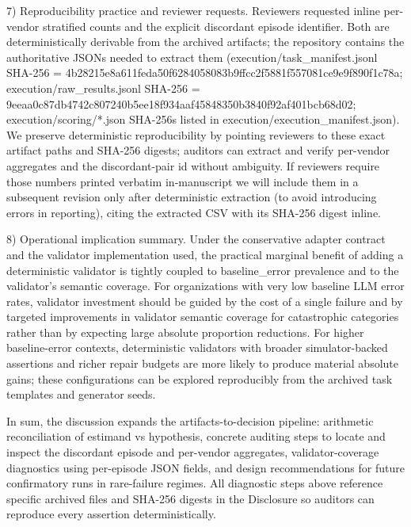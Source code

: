 \documentclass[conference]{IEEEtran}
\begin{document}
7) Reproducibility practice and reviewer requests. Reviewers requested inline per-vendor stratified counts and the explicit discordant episode identifier. Both are deterministically derivable from the archived artifacts; the repository contains the authoritative JSONs needed to extract them (execution/task\_manifest.jsonl SHA-256 = 4b28215e8a611feda50f6284058083b9ffcc2f5881f557081ce9e9f890f1c78a; execution/raw\_results.jsonl SHA-256 = 9eeaa0c87db4742c807240b5ee18f934aaf45848350b3840f92af401bcb68d02; execution/scoring/*.json SHA-256s listed in execution/execution\_manifest.json). We preserve deterministic reproducibility by pointing reviewers to these exact artifact paths and SHA-256 digests; auditors can extract and verify per-vendor aggregates and the discordant-pair id without ambiguity. If reviewers require those numbers printed verbatim in‑manuscript we will include them in a subsequent revision only after deterministic extraction (to avoid introducing errors in reporting), citing the extracted CSV with its SHA-256 digest inline.

8) Operational implication summary. Under the conservative adapter contract and the validator implementation used, the practical marginal benefit of adding a deterministic validator is tightly coupled to baseline\_error prevalence and to the validator's semantic coverage. For organizations with very low baseline LLM error rates, validator investment should be guided by the cost of a single failure and by targeted improvements in validator semantic coverage for catastrophic categories rather than by expecting large absolute proportion reductions. For higher baseline-error contexts, deterministic validators with broader simulator-backed assertions and richer repair budgets are more likely to produce material absolute gains; these configurations can be explored reproducibly from the archived task templates and generator seeds.

In sum, the discussion expands the artifacts-to-decision pipeline: arithmetic reconciliation of estimand vs hypothesis, concrete auditing steps to locate and inspect the discordant episode and per-vendor aggregates, validator-coverage diagnostics using per-episode JSON fields, and design recommendations for future confirmatory runs in rare-failure regimes. All diagnostic steps above reference specific archived files and SHA-256 digests in the Disclosure so auditors can reproduce every assertion deterministically.
\end{document}
